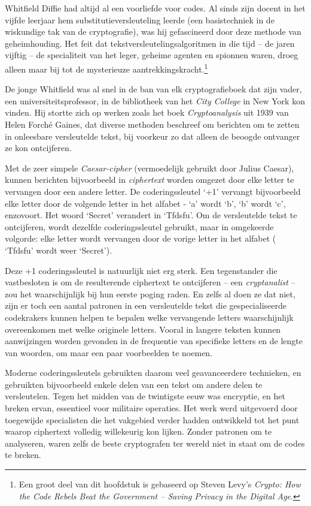 \documentclass[
  a5paper,
  smalldemyvopaper,11pt,twoside,onecolumn,openright,extrafontsizes,
hidelinks]{memoir}
\begin{document}
Whitfield Diffie had altijd al een voorliefde voor codes. Al sinds zijn
docent in het vijfde leerjaar hem substitutieversleuteling leerde (een
basistechniek in de wiskundige tak van de cryptografie), was hij
gefascineerd door deze methode van geheimhouding. Het feit dat
tekstversleutelingsalgoritmen in die tijd -- de jaren vijftig -- de
specialiteit van het leger, geheime agenten en spionnen waren, droeg
alleen maar bij tot de mysterieuze aantrekkingskracht.\footnote{Een
  groot deel van dit hoofdstuk is gebaseerd op Steven Levy's
  \emph{Crypto: How the Code Rebels Beat the Government -- Saving
  Privacy in the Digital Age}.}

De jonge Whitfield was al snel in de ban van elk cryptografieboek dat
zijn vader, een universiteitsprofessor, in de bibliotheek van het
\emph{City College} in New York kon vinden. Hij stortte zich op werken
zoals het boek \emph{Cryptoanalysis} uit 1939 van Helen Forché Gaines,
dat diverse methoden beschreef om berichten om te zetten in onleesbare
versleutelde tekst, bij voorkeur zo dat alleen de beoogde ontvanger ze
kon ontcijferen.

Met de zeer simpele \emph{Caesar-cipher} (vermoedelijk gebruikt door
Julius Caesar), kunnen berichten bijvoorbeeld in \emph{ciphertext}
worden omgezet door elke letter te vervangen door een andere letter. De
coderingssleutel `+1' vervangt bijvoorbeeld elke letter door de volgende
letter in het alfabet - `a' wordt `b', `b' wordt `c', enzovoort. Het
woord `Secret' verandert in `Tfdsfu'. Om de versleutelde tekst te
ontcijferen, wordt dezelfde coderingssleutel gebruikt, maar in
omgekeerde volgorde: elke letter wordt vervangen door de vorige letter
in het alfabet ( `Tfdsfu' wordt weer `Secret').

Deze +1 coderingssleutel is natuurlijk niet erg sterk. Een tegenstander
die vastbesloten is om de resulterende ciphertext te ontcijferen -- een
\emph{cryptanalist} -- zou het waarschijnlijk bij hun eerste poging
raden. En zelfs al doen ze dat niet, zijn er toch een aantal patronen in
een versleutelde tekst die gespecialiseerde codekrakers kunnen helpen te
bepalen welke vervangende letters waarschijnlijk overeenkomen met welke
originele letters. Vooral in langere teksten kunnen aanwijzingen worden
gevonden in de frequentie van specifieke letters en de lengte van
woorden, om maar een paar voorbeelden te noemen.

Moderne coderingssleutels gebruikten daarom veel geavanceerdere
technieken, en gebruikten bijvoorbeeld enkele delen van een tekst om
andere delen te versleutelen. Tegen het midden van de twintigste eeuw
was encryptie, en het breken ervan, essentieel voor militaire operaties.
Het werk werd uitgevoerd door toegewijde specialisten die het vakgebied
verder hadden ontwikkeld tot het punt waarop ciphertext volledig
willekeurig kon lijken. Zonder patronen om te analyseren, waren zelfs de
beste cryptografen ter wereld niet in staat om de codes te breken.
\end{document}
